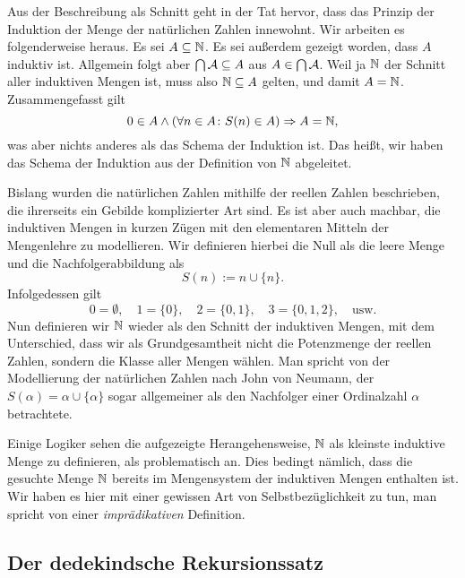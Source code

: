 \noindent
Aus der Beschreibung als Schnitt geht in der Tat hervor, dass das
Prinzip der Induktion der Menge der natürlichen Zahlen innewohnt.
Wir arbeiten es folgenderweise heraus. Es sei $A\subseteq\mathbb N$. Es sei
außerdem gezeigt worden, dass $A$ induktiv ist. Allgemein folgt aber
$\bigcap\mathcal{A}\subseteq A$ aus $A\in\bigcap\mathcal{A}$. Weil ja
$\mathbb N$ der Schnitt aller induktiven Mengen ist, muss also $\mathbb N\subseteq A$
gelten, und damit $A=\mathbb N$. Zusammengefasst gilt
\[0\in A\land (\forall n\in A\colon S(n)\in A)\Rightarrow A = \mathbb N,\]
was aber nichts anderes als das Schema der Induktion ist. Das heißt,
wir haben das Schema der Induktion aus der Definition von $\mathbb N$ abgeleitet.

Bislang wurden die natürlichen Zahlen mithilfe der reellen Zahlen
beschrieben, die ihrerseits ein Gebilde komplizierter Art sind.
Es ist aber auch machbar, die induktiven Mengen in kurzen Zügen mit
den elementaren Mitteln der Mengenlehre zu modellieren. Wir definieren
hierbei die Null als die leere Menge und die Nachfolgerabbildung als
\[S(n) := n\cup \{n\}.\]
Infolgedessen gilt
\[0 = \emptyset,\quad 1 = \{0\},\quad 2 = \{0, 1\},\quad
3 = \{0, 1, 2\},\quad\text{usw.}\]
Nun definieren wir $\mathbb N$ wieder als den Schnitt der induktiven Mengen,
mit dem Unterschied, dass wir als Grundgesamtheit nicht die Potenzmenge
der reellen Zahlen, sondern die Klasse aller Mengen wählen. Man spricht
von der Modellierung der natürlichen Zahlen nach John von Neumann,
der $S(\alpha) = \alpha\cup\{\alpha\}$ sogar allgemeiner als den
Nachfolger einer Ordinalzahl $\alpha$ betrachtete.

Einige Logiker sehen die aufgezeigte Herangehensweise, $\mathbb N$ als kleinste
induktive Menge zu definieren, als problematisch an. Dies bedingt
nämlich, dass die gesuchte Menge $\mathbb N$ bereits im Mengensystem der
induktiven Mengen enthalten ist. Wir haben es hier mit einer gewissen
Art von Selbstbezüglichkeit zu tun, man spricht von einer
\emph{imprädikativen} Definition.

\subsection{Der dedekindsche Rekursionssatz}

